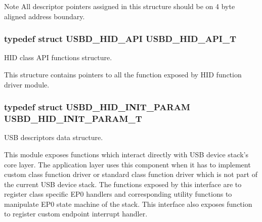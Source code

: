 \begin{DoxyNote}{Note}
All descriptor pointers assigned in this structure should be on 4 byte aligned address boundary. 
\end{DoxyNote}
\hypertarget{group__USBD__HID_ga48d7b7f66a852d99dfbe2c419cc408ba}{
\subsubsection[{U\-S\-B\-D\-\_\-\-H\-I\-D\-\_\-\-A\-P\-I\-\_\-\-T}]{\setlength{\rightskip}{0pt plus 5cm}typedef struct {\bf U\-S\-B\-D\-\_\-\-H\-I\-D\-\_\-\-A\-P\-I}  {\bf U\-S\-B\-D\-\_\-\-H\-I\-D\-\_\-\-A\-P\-I\-\_\-\-T}}}\label{group__USBD__HID_ga48d7b7f66a852d99dfbe2c419cc408ba}


H\-I\-D class A\-P\-I functions structure.

This structure contains pointers to all the function exposed by H\-I\-D function driver module. 

\hypertarget{group__USBD__HID_ga192251fa5ec461eaa9a77b76dbe7c3fa}{
\subsubsection[{U\-S\-B\-D\-\_\-\-H\-I\-D\-\_\-\-I\-N\-I\-T\-\_\-\-P\-A\-R\-A\-M\-\_\-\-T}]{\setlength{\rightskip}{0pt plus 5cm}typedef struct {\bf U\-S\-B\-D\-\_\-\-H\-I\-D\-\_\-\-I\-N\-I\-T\-\_\-\-P\-A\-R\-A\-M}  {\bf U\-S\-B\-D\-\_\-\-H\-I\-D\-\_\-\-I\-N\-I\-T\-\_\-\-P\-A\-R\-A\-M\-\_\-\-T}}}\label{group__USBD__HID_ga192251fa5ec461eaa9a77b76dbe7c3fa}


U\-S\-B descriptors data structure. 

This module exposes functions which interact directly with U\-S\-B device stack's core layer. The application layer uses this component when it has to implement custom class function driver or standard class function driver which is not part of the current U\-S\-B device stack. The functions exposed by this interface are to register class specific E\-P0 handlers and corresponding utility functions to manipulate E\-P0 state machine of the stack. This interface also exposes function to register custom endpoint interrupt handler. 